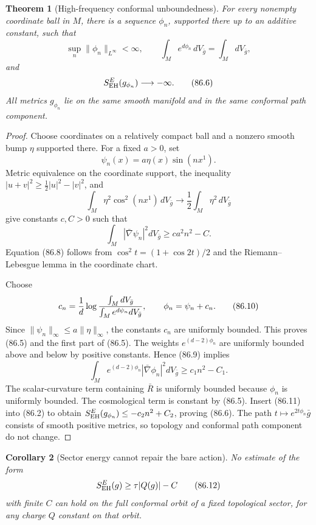 \documentclass[11pt]{article}
\newtheorem{theorem}{Theorem}[section]
\newtheorem{corollary}[theorem]{Corollary}
\begin{document}
\begin{theorem}[High-frequency conformal unboundedness]
\label{thm:v11v86-unbounded}
For every nonempty coordinate ball in \(M\), there is a sequence
\(\phi_n\), supported there up to an additive constant, such that
\[
 \sup_n\|\phi_n\|_{L^\infty}<\infty,\qquad
 \int_Me^{d\phi_n}\,dV_{\bar g}
             =\int_MdV_{\bar g},                            \tag{86.5}
\]
and
\[
                         S_{\rm EH}^{E}(g_{\phi_n})
                         \longrightarrow-\infty.             \tag{86.6}
\]
All metrics \(g_{\phi_n}\) lie on the same smooth manifold and in the
same conformal path component.
\end{theorem}

\begin{proof}
Choose coordinates on a relatively compact ball and a nonzero smooth
bump \(\eta\) supported there.  For a fixed \(a>0\), set
\[
                       \psi_n(x)=a\eta(x)\sin(nx^1).          \tag{86.7}
\]
Metric equivalence on the coordinate support, the inequality
\(|u+v|^2\ge\frac12|u|^2-|v|^2\), and
\[
 \int_M\eta^2\cos^2(nx^1)\,dV_{\bar g}
            \longrightarrow\frac12\int_M\eta^2\,dV_{\bar g} \tag{86.8}
\]
give constants \(c,C>0\) such that
\[
                         \int_M|\bar\nabla\psi_n|^2dV_{\bar g}
                         \ge ca^2n^2-C.                      \tag{86.9}
\]
Equation (86.8) follows from
\(\cos^2 t=(1+\cos2t)/2\) and the Riemann--Lebesgue lemma in the
coordinate chart.

Choose
\[
 c_n={1\over d}\log
 { \int_MdV_{\bar g}\over
   \int_Me^{d\psi_n}dV_{\bar g}},\qquad
 \phi_n=\psi_n+c_n.                                         \tag{86.10}
\]
Since \(\|\psi_n\|_\infty\le a\|\eta\|_\infty\), the constants \(c_n\)
are uniformly bounded.  This proves (86.5) and the first part of
(86.5).  The weights \(e^{(d-2)\phi_n}\) are uniformly bounded above
and below by positive constants.  Hence (86.9) implies
\[
 \int_Me^{(d-2)\phi_n}|\bar\nabla\phi_n|^2dV_{\bar g}
                         \ge c_1n^2-C_1.                    \tag{86.11}
\]
The scalar-curvature term containing \(\bar R\) is uniformly bounded
because \(\phi_n\) is uniformly bounded.  The cosmological term is
constant by (86.5).  Insert (86.11) into (86.2) to obtain
\(S_{\rm EH}^{E}(g_{\phi_n})\le-c_2n^2+C_2\), proving (86.6).
The path \(t\mapsto e^{2t\phi_n}\bar g\) consists of smooth positive
metrics, so topology and conformal path component do not change.
\end{proof}

\begin{corollary}[Sector energy cannot repair the bare action]
\label{cor:v11v86-sector}
No estimate of the form
\[
                         S_{\rm EH}^{E}(g)\ge\tau|Q(g)|-C    \tag{86.12}
\]
with finite \(C\) can hold on the full conformal orbit of a fixed
topological sector, for any charge \(Q\) constant on that orbit.
\end{corollary}
\end{document}
